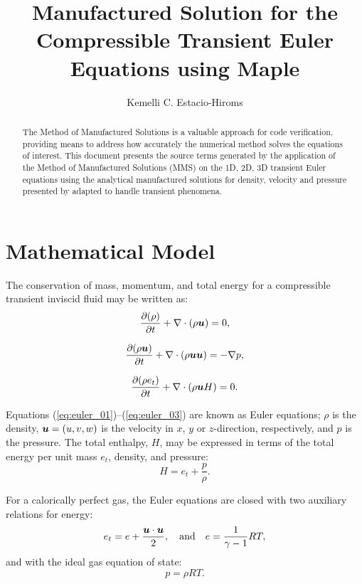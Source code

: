 \documentclass[10pt]{article}
\title{Manufactured Solution for the Compressible Transient Euler Equations using Maple}
\author{Kemelli C. Estacio-Hiroms}
\newcommand{\Diff}[2] {\dfrac{\partial( #1)}{\partial #2}}
\newcommand{\bv}[1]{\ensuremath{\mbox{\boldmath$ #1 $}}}
\begin{document}
\maketitle

\begin{abstract}
The Method of Manufactured Solutions is a valuable approach for code verification, providing means to address how accurately the numerical method solves the equations of interest.
This document presents the source terms generated by the application of the Method of Manufactured Solutions (MMS) on the 1D, 2D, 3D transient Euler equations using the analytical manufactured solutions for density, velocity and pressure presented by \citet{Roy2002}  adapted to handle transient phenomena.
\end{abstract}





\section{Mathematical Model}

The conservation of mass, momentum, and total energy for a compressible transient inviscid fluid may be written as:
\begin{equation}
 \label{eq:euler_01}
\Diff{\rho}{t} +\nabla \cdot \left(\rho \bv{u}\right) = 0,
\end{equation}

\begin{equation}
 \label{eq:euler_02}
\Diff{\rho \bv{u}}{t} +\nabla\cdot\left(\rho\bv{u}\bv{u}\right) = -\nabla p,
\end{equation}

\begin{equation}
 \label{eq:euler_03}
\Diff{\rho e_t}{t} +\nabla\cdot\left(\rho \bv{u} H\right) = 0.
\end{equation}
%

Equations (\ref{eq:euler_01})--(\ref{eq:euler_03}) are known as Euler equations; $\rho$ is the density, $\bv{u}=(u,v,w)$ is the velocity in $x$, $y$ or $z$-direction, respectively,    and $p$ is the pressure. The total enthalpy, $H$, may be expressed in terms of the total energy per unit mass $e_t$, density, and pressure:
$$H = e_t + \dfrac{p}{\rho}.$$

For a calorically perfect gas, the Euler equations are closed with two auxiliary relations for energy:
\begin{equation}
 \label{eq:euler_04}
e_t= e+\dfrac{\bv{u}\cdot \bv{u}}{2},\quad\mbox{and}\quad e=\dfrac{1}{\gamma -1}RT ,
\end{equation}
and with the ideal gas equation of state:
\begin{equation}
 \label{eq:euler_05}
p=\rho RT.
\end{equation}
\end{document}
